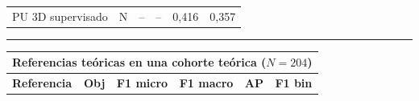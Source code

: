 \begin{table}[p]
\begin{tabularx}{\textwidth}{Xc c c c c}
PU 3D supervisado
& N
& --
& --
& 0,416
& 0,357 \\

\end{tabularx}

 \noindent\rule{\textwidth}{1.2pt}

\begin{tabularx}{\textwidth}{Xc c c c c}
\toprule
\multicolumn{6}{l}{\textbf{Referencias teóricas en una cohorte teórica (\(N=204\))}} \\
\midrule
\textbf{Referencia} &
\textbf{Obj} &
\textbf{F1 micro} &
\textbf{F1 macro} &
\textbf{AP} &
\textbf{F1 bin} \\
\midrule
















\end{tabularx}
\end{table}
